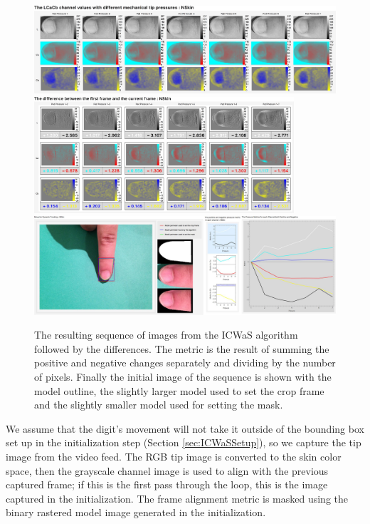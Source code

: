 \begin{figure}[h!]
  \centering
    \includegraphics[width=1.00\textwidth]{Chapter4/Figs/Final_Fig_Channels_NSkin.jpg}
    \includegraphics[width=0.86\textwidth]{Chapter4/Figs/Final_Fig_Total_Difference_NSkin.jpg}
    \includegraphics[width=1.00\textwidth]{Chapter4/Figs/Final_Fig_Misc_NSkin.jpg}
        \caption{The resulting sequence of images from the ICWaS algorithm followed by the differences. The metric is the result of summing the positive and negative changes separately and dividing by the number of pixels. Finally the initial image of the sequence is shown with the model outline, the slightly larger model used to set the crop frame and the slightly smaller model used for setting the mask.}\label{fig:ICWaSResultNSkin}
\end{figure}

We assume that the digit's movement will not take it outside of the bounding box set up in the initialization step (Section \ref{sec:ICWaSSetup}), so we capture the tip image from the video feed. The RGB tip image is converted to the skin color space, then the grayscale channel image is used to align with the previous captured frame; if this is the first pass through the loop, this is the image captured in the initialization. The frame alignment metric is masked using the binary rastered model image generated in the initialization.

